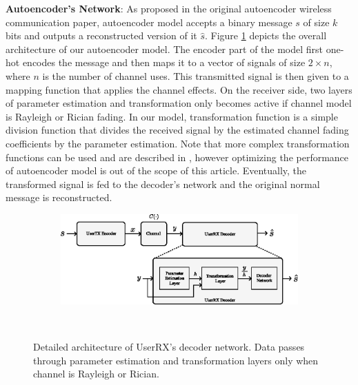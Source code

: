 \textbf{Autoencoder's Network}: As proposed in the original autoencoder wireless communication paper, autoencoder model accepts a binary message \(s\) of size \(k\) bits and outputs a reconstructed version of it \(\hat{s}\). Figure \ref{fig:autoencoder_architecture} depicts the overall architecture of our autoencoder model. The encoder part of the model first one-hot encodes the message and then maps it to a vector of signals of size \(2 \times n\), where \(n\) is the number of channel uses. This transmitted signal is then given to a mapping function that applies the channel effects. On the receiver side, two layers of parameter estimation and transformation only becomes active if channel model is Rayleigh or Rician fading. In our model, transformation function is a simple division function that divides the received signal by the estimated channel fading coefficients by the parameter estimation. Note that more complex transformation functions can be used and are described in \cite{o2017introduction}, however optimizing the performance of autoencoder model is out of the scope of this article. Eventually, the transformed signal is fed to the decoder's network and the original normal message is reconstructed. 

\begin{figure}[tp!]
	\center
	\begin{subfigure}{0.5\textwidth}
		\includegraphics[width=\linewidth]{figs/autoencoder_architecture}
	\end{subfigure}
	\\
	\caption{Detailed architecture of UserRX's decoder network. Data passes through parameter estimation and transformation layers only when channel is Rayleigh or Rician.}	
	\label{fig:autoencoder_architecture}
\end{figure}

